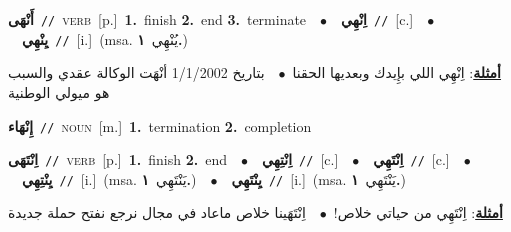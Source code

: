 \documentclass[10pt,a4paper,twoside]{article} %
\begin{document}
\begin{multicols}{2}
{\setlength\topsep{0pt}\textbf{\foreignlanguage{arabic}{أَنْهَى}}\ {\color{gray}\texttt{//}\color{black}}\ \textsc{verb}\ [p.]\ \textbf{1.}~finish  \textbf{2.}~end  \textbf{3.}~terminate\ \ $\bullet$\ \ \setlength\topsep{0pt}\textbf{\foreignlanguage{arabic}{اِنْهِي}}\ {\color{gray}\texttt{//}\color{black}}\ [c.]\ \ $\bullet$\ \ \setlength\topsep{0pt}\textbf{\foreignlanguage{arabic}{يِنْهِي}}\ {\color{gray}\texttt{//}\color{black}}\ [i.]\ \color{gray}(msa. \foreignlanguage{arabic}{يُنْهِي}~\foreignlanguage{arabic}{\textbf{١.}})\color{black}\  \begin{flushright}\color{gray}\foreignlanguage{arabic}{\textbf{\underline{\foreignlanguage{arabic}{أمثلة}}}: اِنْهِي اللي بإِيدك وبعديها الحقنا\ $\bullet$\ \  بتاريخ 1/1/2002 أنْهَت الوكالة عقدي والسبب هو ميولي الوطنية}\end{flushright}\color{black}} \vspace{2mm}

{\setlength\topsep{0pt}\textbf{\foreignlanguage{arabic}{إِنْهَاء}}\ {\color{gray}\texttt{//}\color{black}}\ \textsc{noun}\ [m.]\ \textbf{1.}~termination  \textbf{2.}~completion\ } \vspace{2mm}

{\setlength\topsep{0pt}\textbf{\foreignlanguage{arabic}{اِنْتَهَى}}\ {\color{gray}\texttt{//}\color{black}}\ \textsc{verb}\ [p.]\ \textbf{1.}~finish  \textbf{2.}~end\ \ $\bullet$\ \ \setlength\topsep{0pt}\textbf{\foreignlanguage{arabic}{اِنْتِهِي}}\ {\color{gray}\texttt{//}\color{black}}\ [c.]\ \ $\bullet$\ \ \setlength\topsep{0pt}\textbf{\foreignlanguage{arabic}{اِنْتَهِي}}\ {\color{gray}\texttt{//}\color{black}}\ [c.]\ \ $\bullet$\ \ \setlength\topsep{0pt}\textbf{\foreignlanguage{arabic}{يِنْتِهِي}}\ {\color{gray}\texttt{//}\color{black}}\ [i.]\ \color{gray}(msa. \foreignlanguage{arabic}{يَنْتَهِي}~\foreignlanguage{arabic}{\textbf{١.}})\color{black}\ \ $\bullet$\ \ \setlength\topsep{0pt}\textbf{\foreignlanguage{arabic}{يِنْتَهِي}}\ {\color{gray}\texttt{//}\color{black}}\ [i.]\ \color{gray}(msa. \foreignlanguage{arabic}{يَنْتَهِي}~\foreignlanguage{arabic}{\textbf{١.}})\color{black}\  \begin{flushright}\color{gray}\foreignlanguage{arabic}{\textbf{\underline{\foreignlanguage{arabic}{أمثلة}}}: اِنْتَهِي من حياتي خلاص!\ $\bullet$\ \  اِنْتَهَينا خلاص ماعاد في مجال نرجع نفتح حملة جديدة}\end{flushright}\color{black}} \vspace{2mm}


\end{multicols}
\end{document}
